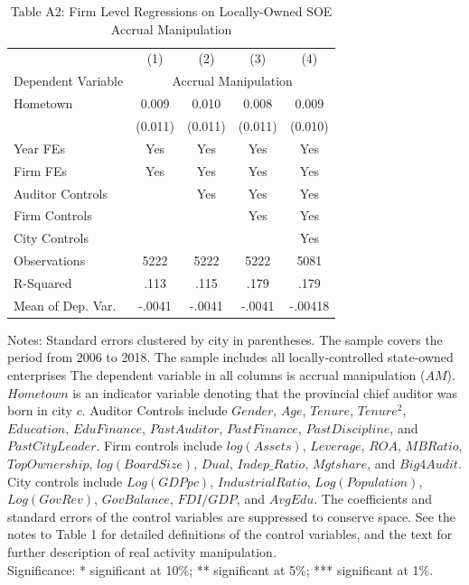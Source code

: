 \begin{table}[p]\centering\captionsetup{width=\textwidth,labelformat=empty}\begin{threeparttable}\footnotesize{
\def\sym#1{\ifmmode^{#1}\else\(^{#1}\)\fi}
\caption{Table A2: Firm Level Regressions on Locally-Owned SOE Accrual Manipulation}
\begin{tabular}{l*{4}{c}}
\hline\hline
                    &\multicolumn{1}{c}{(1)}         &\multicolumn{1}{c}{(2)}         &\multicolumn{1}{c}{(3)}         &\multicolumn{1}{c}{(4)}         \\
Dependent Variable & \multicolumn{4}{c}{ Accrual Manipulation }\\
\hline
Hometown            &       0.009         &       0.010         &       0.008         &       0.009         \\
                    &     (0.011)         &     (0.011)         &     (0.011)         &     (0.010)         \\
\hline
Year FEs         & Yes & Yes & Yes & Yes \\
Firm FEs         & Yes & Yes & Yes & Yes \\
Auditor Controls &     & Yes & Yes & Yes \\
Firm Controls    &     &     & Yes & Yes \\
City Controls    &     &     &     & Yes \\
\hline
Observations        &        5222         &        5222         &        5222         &        5081         \\
R-Squared           &        .113         &        .115         &        .179         &        .179         \\
Mean of Dep. Var.   &      -.0041         &      -.0041         &      -.0041         &     -.00418         \\
\hline\hline
\end{tabular}}
\captionsetup{justification=justified,labelformat=empty}
\begin{tablenotes}
\item Notes: Standard errors clustered by city in parentheses. The sample covers the period from 2006 to 2018. The sample includes all locally-controlled state-owned enterprises The dependent variable in all columns is accrual manipulation ($ AM $). $ Hometown $ is an indicator variable denoting that the provincial chief auditor was born in city $ c $. Auditor Controls include $ Gender $, $ Age $, $ Tenure $, $ Tenure^2 $, $ Education $, $ EduFinance $, $ PastAuditor $, $ PastFinance $, $ PastDiscipline $, and $ PastCityLeader $. Firm controls include $ log(Assets) $, $ Leverage $, $ ROA $, $ MBRatio $, $ TopOwnership $, $ log(BoardSize) $, $ Dual $, $ Indep\_Ratio $, $ Mgtshare $, and $ Big4Audit $. City controls include $ Log(GDP pc) $, $ IndustrialRatio $, $ Log(Population) $, $ Log(GovRev) $, $ GovBalance $, $ FDI/GDP $, and $ AvgEdu $. The coefficients and standard errors of the control variables are suppressed to conserve space. See the notes to Table 1 for detailed definitions of the control variables, and the text for further description of real activity manipulation.   \\  Significance: * significant at 10\%; ** significant at 5\%; *** significant at 1\%.

\end{tablenotes}
\end{threeparttable}
\end{table}
